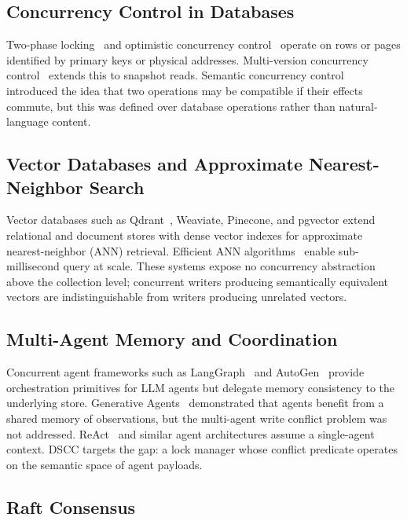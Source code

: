 \documentclass[sigconf]{acmart}
\begin{document}
\subsection{Concurrency Control in Databases}

Two-phase locking~\cite{gray1976granularity} and optimistic concurrency
control~\cite{kung1981optimistic} operate on rows or pages identified by primary keys or
physical addresses. Multi-version concurrency control~\cite{bernstein1983multiversion}
extends this to snapshot reads. Semantic concurrency control~\cite{garcia-molina1983}
introduced the idea that two operations may be compatible if their effects commute, but
this was defined over database operations rather than natural-language content.

\subsection{Vector Databases and Approximate Nearest-Neighbor Search}

Vector databases such as Qdrant~\cite{qdrant}, Weaviate, Pinecone, and pgvector extend
relational and document stores with dense vector indexes for approximate nearest-neighbor
(ANN) retrieval. Efficient ANN algorithms~\cite{faiss, hnswlib} enable sub-millisecond
query at scale. These systems expose no concurrency abstraction above the collection
level; concurrent writers producing semantically equivalent vectors are indistinguishable
from writers producing unrelated vectors.

\subsection{Multi-Agent Memory and Coordination}

Concurrent agent frameworks such as LangGraph~\cite{langgraph} and AutoGen~\cite{autogen}
provide orchestration primitives for LLM agents but delegate memory consistency to the
underlying store. Generative Agents~\cite{park2023generative} demonstrated that agents
benefit from a shared memory of observations, but the multi-agent write conflict problem
was not addressed. ReAct~\cite{yao2023react} and similar agent architectures assume a
single-agent context. DSCC targets the gap: a lock manager whose conflict predicate
operates on the semantic space of agent payloads.

\subsection{Raft Consensus}
\end{document}
